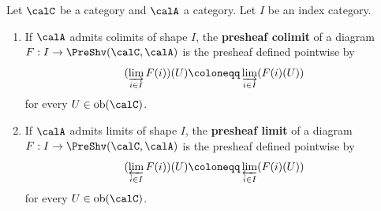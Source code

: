 \begin{definition} \label{definition:colimit_in_a_presheaf_category}
    Let $\calC$ be a category and $\calA$ a category. Let $I$ be an index category.
    \begin{enumerate}
        \item If $\calA$ admits colimits of shape $I$, the \textbf{presheaf colimit} of a diagram $F: I \to \PreShv(\calC, \calA)$ is the presheaf defined pointwise by
        \[ (\varinjlim_{i \in I} F(i))(U) \coloneqq \varinjlim_{i \in I} (F(i)(U)) \]
        for every $U \in \text{ob}(\calC)$.
        \item If $\calA$ admits limits of shape $I$, the \textbf{presheaf limit} of a diagram $F: I \to \PreShv(\calC, \calA)$ is the presheaf defined pointwise by
        \[ (\varprojlim_{i \in I} F(i))(U) \coloneqq \varprojlim_{i \in I} (F(i)(U)) \]
        for every $U \in \text{ob}(\calC)$.
    \end{enumerate}
\end{definition}
